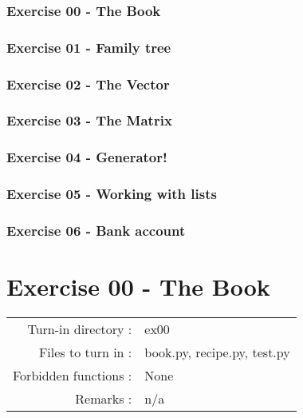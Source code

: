 \documentclass[]{article}
\begin{document}
\hypertarget{exercise-00---the-book}{%
\subsubsection{Exercise 00 - The Book}\label{exercise-00---the-book}}

\hypertarget{exercise-01---family-tree}{%
\subsubsection{Exercise 01 - Family
tree}\label{exercise-01---family-tree}}

\hypertarget{exercise-02---the-vector}{%
\subsubsection{Exercise 02 - The
Vector}\label{exercise-02---the-vector}}

\hypertarget{exercise-03---the-matrix}{%
\subsubsection{Exercise 03 - The
Matrix}\label{exercise-03---the-matrix}}

\hypertarget{exercise-04---generator}{%
\subsubsection{Exercise 04 - Generator!}\label{exercise-04---generator}}

\hypertarget{exercise-05---working-with-lists}{%
\subsubsection{Exercise 05 - Working with
lists}\label{exercise-05---working-with-lists}}

\hypertarget{exercise-06---bank-account}{%
\subsubsection{Exercise 06 - Bank
account}\label{exercise-06---bank-account}}

\clearpage

\hypertarget{exercise-00---the-book-1}{%
\section{Exercise 00 - The Book}\label{exercise-00---the-book-1}}

\begin{longtable}[]{@{}rl@{}}
\toprule
\endhead
Turn-in directory : & ex00\tabularnewline
Files to turn in : & book.py, recipe.py, test.py\tabularnewline
Forbidden functions : & None\tabularnewline
Remarks : & n/a\tabularnewline
\bottomrule
\end{longtable}
\end{document}

